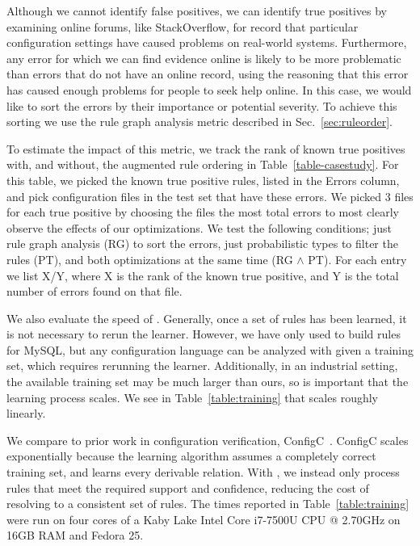 Although we cannot identify false positives, we can identify true positives by examining online forums, like StackOverflow, for record that
particular configuration settings have caused problems on real-world systems.
Furthermore, any error for which we can find evidence online is likely to be more problematic than errors that do not have an online record, 
  using the reasoning that this error has caused enough problems for people to seek help online.
In this case, we would like \app to sort the errors by their importance or potential severity.
To achieve this sorting we use the rule graph analysis metric described in Sec.~\ref{sec:ruleorder}.

To estimate the impact of this metric, we track the rank of known true positives with, and without, the augmented rule ordering in Table~\ref{table-casestudy}.
For this table, we picked the known true positive rules, listed in the Errors column, and pick configuration files in the test set that have these errors.
We picked 3 files for each true positive by choosing the files the most total errors to most clearly observe the effects of our optimizations.
We test the following conditions; just rule graph analysis (RG) to sort the errors, just probabilistic types to filter the rules (PT), and both optimizations at the same time (RG $\land$ PT).
For each entry we list X/Y, where X is the rank of the known true positive, and Y is the total number of errors found on that file.



We also evaluate the speed of \app.
Generally, once a set of rules has been learned, it is not necessary to rerun the learner.
However, we have only used \app to build rules for MySQL, but any configuration language can be analyzed with \app given a training set, which requires rerunning the learner.
Additionally, in an industrial setting, the available training set may be much larger than ours, so is important that the learning process scales.
We see in Table~\ref{table:training} that \app scales roughly linearly.

We compare \app to prior work in configuration verification, ConfigC~\cite{santolucitoCAV}.
ConfigC scales exponentially because the learning algorithm assumes a completely correct training set, and learns every derivable relation.
With \app, we instead only process rules that meet the required support and confidence, reducing the cost of resolving to a consistent set of rules. 
The times reported in Table~\ref{table:training} were run on four cores of a Kaby Lake Intel Core i7-7500U CPU @ 2.70GHz on 16GB RAM and Fedora 25.

